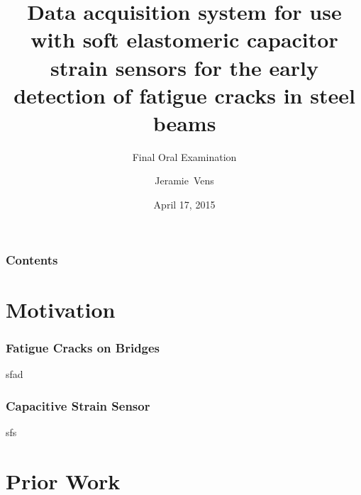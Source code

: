 \documentclass{beamer}
\title{Data acquisition system for use with soft elastomeric capacitor
	strain sensors for the early detection of fatigue cracks in steel beams}
\subtitle{Final Oral Examination}
\author{Jeramie~Vens}
\institute{Iowa State University}
\date{April 17, 2015}
\begin{document}
	\begin{frame}
		\titlepage
	\end{frame}

	\begin{frame}
		\frametitle{Contents}
		\tableofcontents
	\end{frame}

	\section{Motivation}
	
		\begin{frame}
			\frametitle{Fatigue Cracks on Bridges}
			sfad
		\end{frame}
		
		\begin{frame}
			\frametitle{Capacitive Strain Sensor}
			sfs
		\end{frame}

	\section{Prior Work}
	
	
\end{document}
